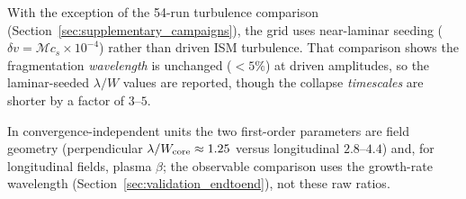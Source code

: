 \documentclass[usenatbib,twoside,twocolumn]{mnras}
\begin{document}
With the exception of the 54-run turbulence comparison (Section~\ref{sec:supplementary_campaigns}), the grid uses near-laminar seeding ($\delta v=\mathcal{M}c_s\times10^{-4}$) rather than driven ISM turbulence. That comparison shows the fragmentation \textit{wavelength} is unchanged ($<5\%$) at driven amplitudes, so the laminar-seeded $\lambda/W$ values are reported, though the collapse \textit{timescales} are shorter by a factor of $3$--$5$.

In convergence-independent units the two first-order parameters are field geometry (perpendicular $\lambda/W_{\rm core}\approx1.25$ versus longitudinal $2.8$--$4.4$) and, for longitudinal fields, plasma $\beta$; the observable comparison uses the growth-rate wavelength (Section~\ref{sec:validation_endtoend}), not these raw ratios.


\end{document}
